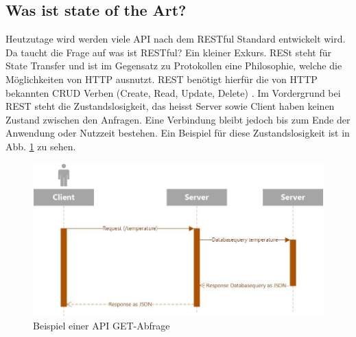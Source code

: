 \subsection{Was ist state of the Art?}
Heutzutage wird werden viele API nach dem RESTful Standard entwickelt wird. Da taucht die Frage auf was ist RESTful? Ein kleiner Exkurs. RESt steht für State Transfer und ist im Gegensatz zu Protokollen eine Philosophie, welche die Möglichkeiten von HTTP ausnutzt. REST benötigt hierfür die von HTTP bekannten CRUD Verben (Create, Read, Update, Delete) \cite{LornaJaneMitchell2013oreilly}. Im Vordergrund bei REST steht die Zustandslosigkeit, das heisst Server sowie Client haben keinen Zustand zwischen den Anfragen. Eine Verbindung bleibt jedoch bis zum Ende der Anwendung oder Nutzzeit bestehen. Ein Beispiel für diese Zustandslosigkeit ist in Abb. \ref{img:Sequenzdiagramm_API} zu sehen.\\

\begin{figure}[h!]
	\centering
	\includegraphics[width=1\linewidth]{img/Sequenzdiagramm_API}
	\caption{Beispiel einer API GET-Abfrage}
	\label{img:Sequenzdiagramm_API}
\end{figure}


